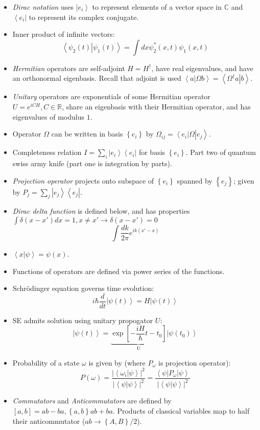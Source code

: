 \documentclass[10pt]{report}
\newcommand{\bra}[1]{\left<#1\right|}
\newcommand{\ket}[1]{\left|#1\right>}
\newcommand{\dotp}[2]{\left<#1\left.\right|#2\right>}
\newcommand{\rd}[2]{\frac{d#1}{d#2}}
\newcommand{\abs}[1]{\left|#1\right|}
\begin{document}
\begin{itemize}
	\item \emph{Dirac notation} uses $\ket{e_i}$ to represent elements of a vector space in $\mathbb{C}$ and $\bra{e_i}$ to represent its complex conjugate. 
	\item Inner product of infinite vectors:
		$$\dotp{\psi_2(t)}{\psi_1(t)}=\int dx \psi_2^*(x,t)\psi_1(x,t)$$
	\item \emph{Hermitian} operators are self-adjoint $H=H^\dagger$, have real eigenvalues, and have an orthonormal eigenbasis. Recall that adjoint is used $\dotp{a}{\Omega b} = \dotp{\Omega^\dagger a}{b}$.
	\item \emph{Unitary} operators are exponentials of some Hermitian operator $U=e^{iCH},C \in \mathbb{R}$, share an eigenbasis with their Hermitian operator, and has eigenvalues of modulus $1$. 
	\item Operator $\Omega$ can be written in basis $\left\{ e_i \right\}$ by $\Omega_{ij}=\bra{e_i}\Omega\ket{e_j}$.
	\item Completeness relation $I=\sum_i \ket{e_i}\bra{e_i}$ for basis $\left\{ e_i \right\}$. Part two of quantum swiss army knife (part one is integration by parts).
	\item \emph{Projection operator} projects onto subspace of $\left\{ e_i \right\}$ spanned by $\left\{ e_j \right\}$; given by $P_j=\sum_j \ket{e_j}\bra{e_j}$.
	\item \emph{Dirac delta function} is defined below, and has properties $\int \delta(x-x') dx = 1, x\neq x' \to \delta(x-x') =0$
		$$\int \frac{dk}{2\pi}e^{ik(x'-x)}$$
	\item $\dotp{x}{\psi} = \psi(x)$. 
	\item Functions of operators are defined via power series of the functions. 
	\item Schr\"odinger equation governs time evolution:
		$$i\hbar\rd{}{t}\ket{\psi(t)}=H\ket{\psi(t)}$$
	\item SE admits solution using unitary propogator $U$:
		$$\ket{\psi(t)} = \underbrace{\exp\left[ -\frac{iH}{\hbar}t-t_0 \right]}_{\text{U}}\ket{\psi(t_0)}$$
	\item Probability of a state $\omega$ is given by (where $P_\omega$ is projection operator):
		$$P(\omega)=\frac{\abs{\dotp{\omega_i}{\psi}}^2}{\abs{\dotp{\psi}{\psi}}^2} = \frac{\bra{\psi}P_\omega\ket{\psi}}{\abs{\dotp{\psi}{\psi}}^2}$$
	\item \emph{Commutators} and \emph{Anticommutators} are defined by $\left[ a,b \right]=ab-ba, \left\{ a,b \right\}ab+ba$. Products of classical variables map to half their anticommutator ($ab \to \left\{ A,B \right\}/2$).

\end{itemize}
\end{document}
